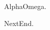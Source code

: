 \documentclass[11pt,aspectratio=169]{beamer}
\date{}
\begin{document}
\begin{frame}{Alpha}Omega.\end{frame}\begin{frame}{Next}End.\end{frame}
\end{document}
